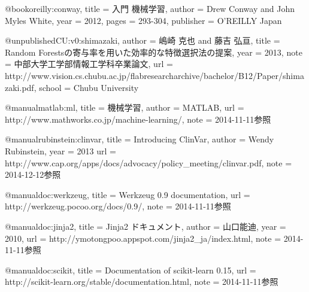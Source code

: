 @book{oreilly:conway,
	title     = {入門 機械学習},
	author    = {Drew Conway and John Myles White},
	year      = {2012},
	pages     = {293-304},
	publisher = {O'REILLY Japan}
}

@unpublished{CU:v0:shimazaki,
	author    = {嶋崎 克也 and 藤吉 弘亘},
	title     = {Random Forestsの寄与率を用いた効率的な特徴選択法の提案},
	year      = {2013},
	note      = {中部大学工学部情報工学科卒業論文},
	url       = {http://www.vision.cs.chubu.ac.jp/flabresearcharchive/bachelor/B12/Paper/shimazaki.pdf},
	school    = {Chubu University}
}

@manual{matlab:ml,
	title     = {機械学習},
	author    = {MATLAB},
	url       = {http://www.mathworks.co.jp/machine-learning/},
	note      = {2014-11-11参照}
}

@manual{rubinstein:clinvar,
	title     = {Introducing ClinVar},
	author    = {Wendy Rubinstein},
	year      = {2013}
	url       = {http://www.cap.org/apps/docs/advocacy/policy\_meeting/clinvar.pdf},
	note      = {2014-12-12参照}
}

@manual{doc:werkzeug,
	title     = {Werkzeug 0.9 documentation},
	url       = {http://werkzeug.pocoo.org/docs/0.9/},
	note      = {2014-11-11参照}
}

@manual{doc:jinja2,
	title     = {Jinja2 ドキュメント},
	author    = {山口能迪},
	year      = {2010},
	url       = {http://ymotongpoo.appspot.com/jinja2\_ja/index.html},
	note      = {2014-11-11参照}
}

@manual{doc:scikit,
	title     = {Documentation of scikit-learn 0.15},
	url       = {http://scikit-learn.org/stable/documentation.html},
	note      = {2014-11-11参照}
}